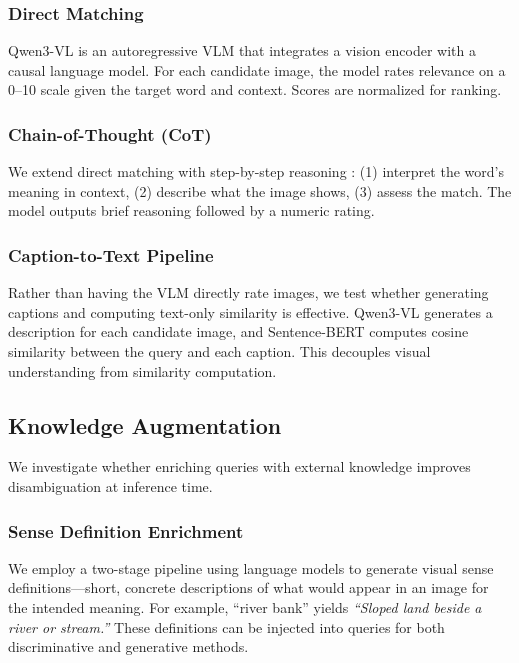 \documentclass[11pt]{article}
\begin{document}
\subsubsection{Direct Matching}

Qwen3-VL \cite{yang2025qwen3} is an autoregressive VLM that integrates a vision encoder with a causal language model. For each candidate image, the model rates relevance on a 0--10 scale given the target word and context. Scores are normalized for ranking.

\subsubsection{Chain-of-Thought (CoT)}

We extend direct matching with step-by-step reasoning \cite{wei2022chain}: (1) interpret the word's meaning in context, (2) describe what the image shows, (3) assess the match. The model outputs brief reasoning followed by a numeric rating.

\subsubsection{Caption-to-Text Pipeline}

Rather than having the VLM directly rate images, we test whether generating captions and computing text-only similarity is effective. Qwen3-VL generates a description for each candidate image, and Sentence-BERT \cite{reimers2019sentence} computes cosine similarity between the query and each caption. This decouples visual understanding from similarity computation.

\subsection{Knowledge Augmentation}
\label{sec:knowledge_aug}

We investigate whether enriching queries with external knowledge improves disambiguation at inference time.

\subsubsection{Sense Definition Enrichment}

We employ a two-stage pipeline using language models to generate visual sense definitions---short, concrete descriptions of what would appear in an image for the intended meaning. For example, ``river bank'' yields \textit{``Sloped land beside a river or stream.''} These definitions can be injected into queries for both discriminative and generative methods.
\end{document}
